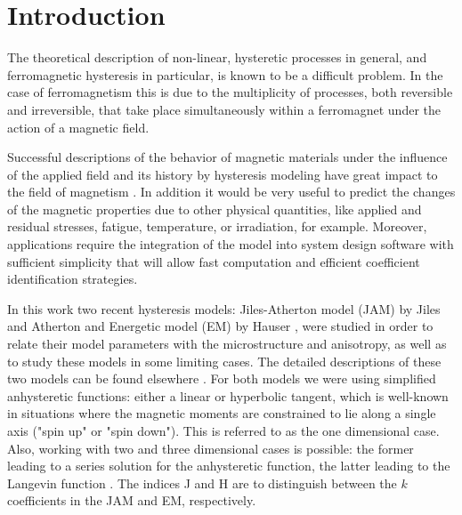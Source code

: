 \documentclass[../main.tex]{subfiles}
\begin{document}
\section{Introduction}

The theoretical description of non-linear, hysteretic processes in general, and ferromagnetic hysteresis in particular, is known to be a difficult problem. In the case of ferromagnetism this is due to the multiplicity of processes, both reversible and irreversible, that take place simultaneously within a ferromagnet under the action of a magnetic field.

Successful descriptions of the behavior of magnetic materials under the influence of the applied field and its history by hysteresis modeling have great impact to the field of magnetism \cite{Bertotti, DellaTorre, Ivanyi, Mayergoyz}. In addition it would be very useful to predict the changes of the magnetic properties due to other physical quantities, like applied and residual stresses, fatigue, temperature, or irradiation, for example. Moreover, applications require the integration of the model into system design software with sufficient simplicity that will allow fast computation and efficient coefficient identification strategies.

In this work two recent hysteresis models: Jiles-Atherton model (JAM) by Jiles and Atherton \cite{Jiles} and Energetic model (EM) by Hauser \cite{JAP75}, were studied in order to relate their model parameters with the microstructure and anisotropy, as well as to study these models in some limiting cases. The detailed descriptions of these two models can be found elsewhere \cite{Jiles, JAP75}. For both models we were using simplified anhysteretic functions: either a linear or hyperbolic tangent, which is well-known in situations where the magnetic moments are constrained to lie along a single axis ("spin up" or "spin down"). This is referred to as the one dimensional case. Also, working with two and three dimensional cases is possible: the former leading to a series solution for the anhysteretic function, the latter leading to the Langevin function \cite{Jiles07}. The indices J and H are to distinguish between the $k$ coefficients in the  JAM and EM, respectively.

\cleardoublepage
\end{document}
